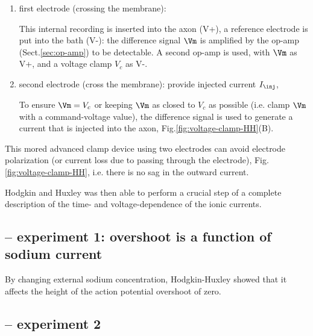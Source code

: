 \begin{enumerate}
  \item first electrode (crossing the membrane):

This internal recording is inserted into the axon (V+), a reference electrode is
put into the bath (V-): the difference signal $\Vm$ is amplified by the op-amp
(Sect.\ref{sec:op-amp}) to be detectable. A second op-amp is used, with $\Vm$ as
V+, and a voltage clamp $V_c$ as V-.

  \item second electrode (cross the membrane): provide injected current
  $I_\inj$,

To ensure $\Vm = V_c$ or keeping $\Vm$ as closed to $V_c$ as possible (i.e.
clamp $\Vm$ with a command-voltage value), the difference signal is used to
generate a current that is injected into the axon,
Fig.\ref{fig:voltage-clamp-HH}(B).

\end{enumerate}

This mored advanced clamp device using two electrodes can avoid electrode
polarization (or current loss due to passing through the electrode),
Fig.\ref{fig:voltage-clamp-HH}, i.e. there is no sag in the outward current.

Hodgkin and Huxley was then able to perform a crucial step of a complete
description of the time- and voltage-dependence of the ionic currents.

\subsection{-- experiment 1: overshoot is a function of sodium current}

By changing external sodium concentration, Hodgkin-Huxley showed that it
affects the height of the action potential overshoot of zero.

\subsection{-- experiment 2}

